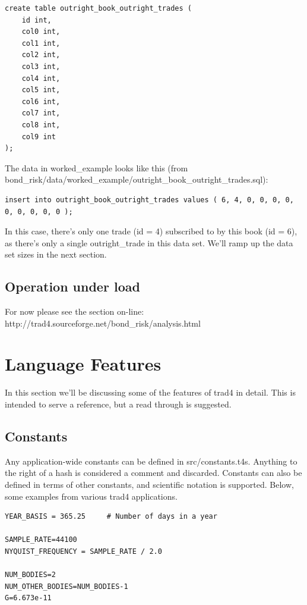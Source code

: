 \documentclass{report}
\begin{document}
\begin{verbatim}
create table outright_book_outright_trades (
    id int,
    col0 int,
    col1 int,
    col2 int,
    col3 int,
    col4 int,
    col5 int,
    col6 int,
    col7 int,
    col8 int,
    col9 int
);
\end{verbatim}

The data in worked_example looks like this (from bond_risk/data/worked_example/outright_book_outright_trades.sql):

\begin{verbatim}
insert into outright_book_outright_trades values ( 6, 4, 0, 0, 0, 0, 0, 0, 0, 0, 0 );
\end{verbatim}

In this case, there's only one trade (id = 4) subscribed to by this book (id = 6), as there's only a single outright_trade in this data set. We'll ramp up the data set sizes in the next section.

\section{Operation under load}

For now please see the section on-line: http://trad4.sourceforge.net/bond_risk/analysis.html

\chapter{Language Features}
\label{sec:Language Features}


In this section we'll be discussing some of the features of trad4 in detail. This is intended to serve a reference, but a read through is suggested.

\section{Constants}

Any application-wide constants can be defined in src/constants.t4s. Anything to the right of a hash is considered a comment and discarded. Constants can also be defined in terms of other constants, and scientific notation is supported. Below, some examples from various trad4 applications.

\begin{verbatim}
YEAR_BASIS = 365.25     # Number of days in a year

SAMPLE_RATE=44100
NYQUIST_FREQUENCY = SAMPLE_RATE / 2.0

NUM_BODIES=2
NUM_OTHER_BODIES=NUM_BODIES-1
G=6.673e-11

\end{verbatim}
\end{document}
